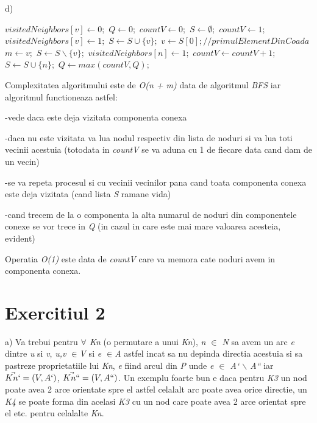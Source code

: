 \documentclass{article}
\begin{document}
d)
\begin{algorithmic}
    \State $visitedNeighbors[v] \leftarrow 0;$
\EndFor
\State $Q \leftarrow 0;$
    \State $countV \leftarrow 0;$
    \State $S \leftarrow \emptyset;$
        \State $countV \leftarrow 1;$
        \State $visitedNeighbors[v] \leftarrow 1;$
        \State $S \leftarrow S \cup \{v\};$
            \State $v \leftarrow S[0]; //primul Element Din Coada$
            \State $m \leftarrow v;$
            \State $S \leftarrow S \backslash \{v\};$
                    \State $visitedNeighbors[n]\leftarrow 1;$
                    \State $countV \leftarrow countV + 1;$
                    \State $S \leftarrow S \cup \{n\};$
                \EndIf
            \EndFor
        \EndWhile
    \EndIf
    \State $Q \leftarrow max(countV,Q);$
\EndFor

Complexitatea algoritmului este de \textit{O(n + m)} data de algoritmul \textit{BFS} iar algoritmul functioneaza astfel: 
    
    -vede daca este deja vizitata componenta conexa 
    
    -daca nu este vizitata va lua nodul respectiv din lista de noduri si va lua toti vecinii acestuia (totodata in \textit{countV} se va aduna cu 1 de fiecare data cand dam de un vecin)
    
    -se va repeta procesul si cu vecinii vecinilor pana cand toata componenta conexa este deja vizitata (cand lista \textit{S} ramane vida)
    
    -cand trecem de la o componenta la alta numarul de noduri din componentele conexe se vor trece in \textit{Q} (in cazul in care este mai mare valoarea acesteia, evident)

Operatia \textit{O(1)} este data de \textit{countV} care va memora cate noduri avem in componenta conexa.

\end{algorithmic}

\section*{Exercitiul 2}
a) Va trebui pentru \textit{$\forall$ Kn} (o permutare a unui \textit{Kn}), \textit{n $\in$ N} sa avem un arc \textit{e} dintre \textit{u} si \textit{v}, \textit{u,v $\in$V} si \textit{e $\in$A} astfel incat sa nu depinda directia acestuia si sa pastreze proprietatiile lui \textit{Kn}, \textit{e} fiind arcul din \textit{P} unde \textit{e $\in$ A` $\backslash$ A``} iar \textit{$\vec{Kn`} = (V,A`)$, $\vec{Kn``} = (V,A``)$}. Un exemplu foarte bun e daca pentru \textit{K3} un nod poate avea 2 arce orientate spre el astfel celalalt arc poate avea orice directie, un \textit{K4} se poate forma din acelasi \textit{K3} cu un nod care poate avea 2 arce orientat spre el etc. pentru celalalte \textit{Kn}.
\end{document}
